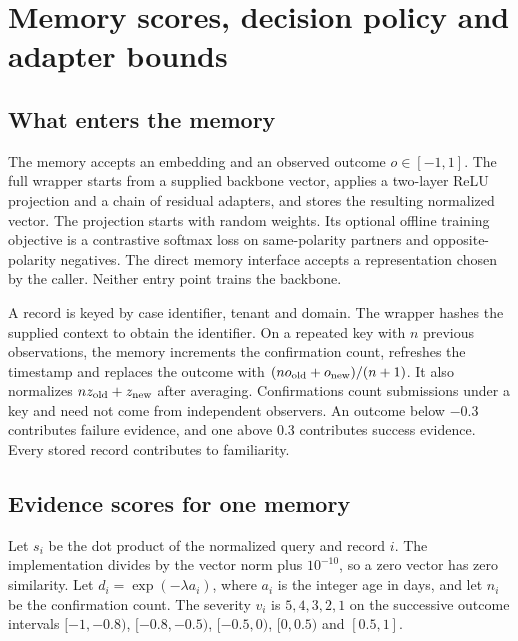 \section{Memory scores, decision policy and adapter bounds}
\label{app:methodref}

\subsection{What enters the memory}

The memory accepts an embedding and an observed outcome $o\in[-1,1]$.
The full wrapper starts from a supplied backbone vector, applies a two-layer
ReLU projection and a chain of residual adapters, and stores the resulting
normalized vector. The projection starts with random weights. Its optional
offline training objective is a contrastive softmax loss on same-polarity
partners and opposite-polarity negatives. The direct memory interface accepts
a representation chosen by the caller. Neither entry point trains the backbone.

A record is keyed by case identifier, tenant and domain. The wrapper hashes
the supplied context to obtain the identifier. On a repeated key with $n$
previous observations, the memory increments the confirmation count, refreshes
the timestamp and replaces the outcome with $(n o_{\rm old}+o_{\rm new})/(n+1)$.
It also normalizes $n z_{\rm old}+z_{\rm new}$ after averaging. Confirmations
count submissions under a key and need not come from independent observers.
An outcome below $-0.3$ contributes failure evidence, and one above $0.3$
contributes success evidence. Every stored record contributes to familiarity.

\subsection{Evidence scores for one memory}

Let $s_i$ be the dot product of the normalized query and record $i$.
The implementation divides by the vector norm plus $10^{-10}$, so a zero
vector has zero similarity. Let $d_i=\exp(-\lambda a_i)$, where $a_i$ is
the integer age in days, and let $n_i$ be the confirmation count.
The severity $v_i$ is $5,4,3,2,1$ on the successive outcome intervals
$[-1,-0.8)$, $[-0.8,-0.5)$, $[-0.5,0)$, $[0,0.5)$ and $[0.5,1]$.

